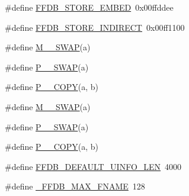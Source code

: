 \begin{DoxyCompactItemize}
\item 
\#define \mbox{\hyperlink{adat-devel_2other__libs_2filedb_2filehash_2ffdb__db_8h_a8c27fbce640478583c85a2dbcf067109}{F\+F\+D\+B\+\_\+\+S\+T\+O\+R\+E\+\_\+\+E\+M\+B\+ED}}~0x00ffddee
\item 
\#define \mbox{\hyperlink{adat-devel_2other__libs_2filedb_2filehash_2ffdb__db_8h_a84d8797a1fc5c466184f6e97582b8275}{F\+F\+D\+B\+\_\+\+S\+T\+O\+R\+E\+\_\+\+I\+N\+D\+I\+R\+E\+CT}}~0x00ff1100
\item 
\#define \mbox{\hyperlink{adat-devel_2other__libs_2filedb_2filehash_2ffdb__db_8h_a4220cdcaf376bc1c58dbad51f73ced28}{M\+\_\+\_\+\+S\+W\+AP}}(a)
\item 
\#define \mbox{\hyperlink{adat-devel_2other__libs_2filedb_2filehash_2ffdb__db_8h_ab04854a4ba26e098f6b9728350bc2cf1}{P\+\_\+\_\+\+S\+W\+AP}}(a)
\item 
\#define \mbox{\hyperlink{adat-devel_2other__libs_2filedb_2filehash_2ffdb__db_8h_a387cd4b0878ce581e570f059a4ae477e}{P\+\_\+\_\+\+C\+O\+PY}}(a,  b)
\item 
\#define \mbox{\hyperlink{adat-devel_2other__libs_2filedb_2filehash_2ffdb__db_8h_a4aa63ee983198bd8e6758ef43e19459e}{M\+\_\+\_\+\+S\+W\+AP}}(a)
\item 
\#define \mbox{\hyperlink{adat-devel_2other__libs_2filedb_2filehash_2ffdb__db_8h_a6e571364100009509db5d8db089f3725}{P\+\_\+\_\+\+S\+W\+AP}}(a)
\item 
\#define \mbox{\hyperlink{adat-devel_2other__libs_2filedb_2filehash_2ffdb__db_8h_a2341b92f48825eaf84b44eaa7b74c185}{P\+\_\+\_\+\+C\+O\+PY}}(a,  b)
\item 
\#define \mbox{\hyperlink{adat-devel_2other__libs_2filedb_2filehash_2ffdb__db_8h_a21d96446db957dd88b256f7321477f1a}{F\+F\+D\+B\+\_\+\+D\+E\+F\+A\+U\+L\+T\+\_\+\+U\+I\+N\+F\+O\+\_\+\+L\+EN}}~4000
\item 
\#define \mbox{\hyperlink{adat-devel_2other__libs_2filedb_2filehash_2ffdb__db_8h_a00ab19cd96ae7c01686ceec249b62522}{\+\_\+\+F\+F\+D\+B\+\_\+\+M\+A\+X\+\_\+\+F\+N\+A\+ME}}~128
\end{DoxyCompactItemize}
